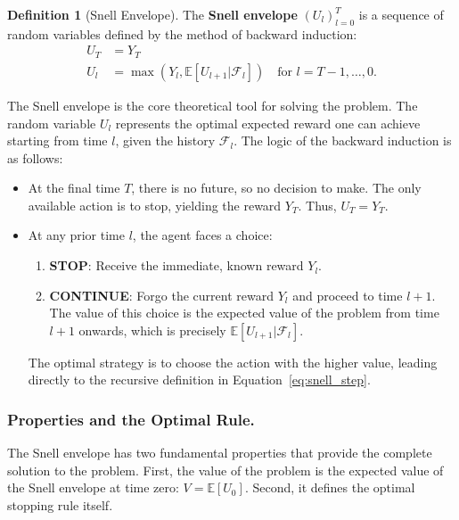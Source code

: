 \documentclass[12pt]{imsart}
\newcommand{\E}{\mathbb{E}}
\newcommand{\F}{\mathcal{F}}
\theoremstyle{plain}
\theoremstyle{definition}
\newtheorem{definition}[theorem]{Definition}
\begin{document}
\begin{definition}[Snell Envelope]\label{def:snell_envelope}
The \textbf{Snell envelope} $(U_l)_{l=0}^T$ is a sequence of random variables defined by the method of backward induction:
\begin{align}
U_T &= Y_T \label{eq:snell_base} \\
U_l &= \max(Y_l, \E[U_{l+1} | \F_l]) \quad \text{for } l = T-1, \dots, 0. \label{eq:snell_step}
\end{align}
\end{definition}

The Snell envelope is the core theoretical tool for solving the problem. The random variable $U_l$ represents the optimal expected reward one can achieve starting from time $l$, given the history $\F_l$. The logic of the backward induction is as follows:
\begin{itemize}
    \item At the final time $T$, there is no future, so no decision to make. The only available action is to stop, yielding the reward $Y_T$. Thus, $U_T = Y_T$.
    \item At any prior time $l$, the agent faces a choice:
        \begin{enumerate}
            \item \textbf{STOP}: Receive the immediate, known reward $Y_l$.
            \item \textbf{CONTINUE}: Forgo the current reward $Y_l$ and proceed to time $l+1$. The value of this choice is the expected value of the problem from time $l+1$ onwards, which is precisely $\E[U_{l+1} | \F_l]$.
        \end{enumerate}
    The optimal strategy is to choose the action with the higher value, leading directly to the recursive definition in Equation~\eqref{eq:snell_step}.
\end{itemize}

\subsubsection{Properties and the Optimal Rule.}
The Snell envelope has two fundamental properties that provide the complete solution to the problem. First, the value of the problem is the expected value of the Snell envelope at time zero: $V = \E[U_0]$. Second, it defines the optimal stopping rule itself.
\end{document}
